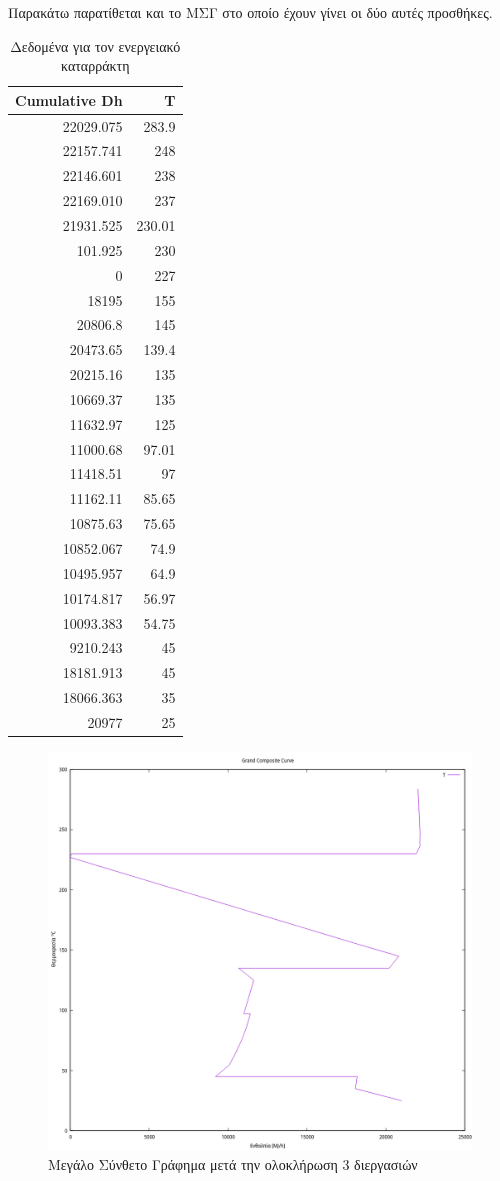 \documentclass[11pt]{article}
\begin{document}
Παρακάτω παρατίθεται και το ΜΣΓ στο οποίο έχουν γίνει οι δύο αυτές προσθήκες.
\begin{table}[htbp]
\caption{Δεδομένα για τον ενεργειακό καταρράκτη}
\centering
\begin{tabular}{rr}
Cumulative  Dh & T\\
\hline
22029.075 & 283.9\\
22157.741 & 248\\
22146.601 & 238\\
22169.010 & 237\\
21931.525 & 230.01\\
101.925 & 230\\
0 & 227\\
18195 & 155\\
20806.8 & 145\\
20473.65 & 139.4\\
20215.16 & 135\\
10669.37 & 135\\
11632.97 & 125\\
11000.68 & 97.01\\
11418.51 & 97\\
11162.11 & 85.65\\
10875.63 & 75.65\\
10852.067 & 74.9\\
10495.957 & 64.9\\
10174.817 & 56.97\\
10093.383 & 54.75\\
9210.243 & 45\\
18181.913 & 45\\
18066.363 & 35\\
20977 & 25\\
\end{tabular}
\end{table}

\begin{figure}[htbp]
\centering
\includegraphics[width=.9\linewidth]{Diagrams/grand_composite_curve_2.png}
\caption{Μεγάλο Σύνθετο Γράφημα μετά την ολοκλήρωση 3 διεργασιών}
\end{figure}
\end{document}
